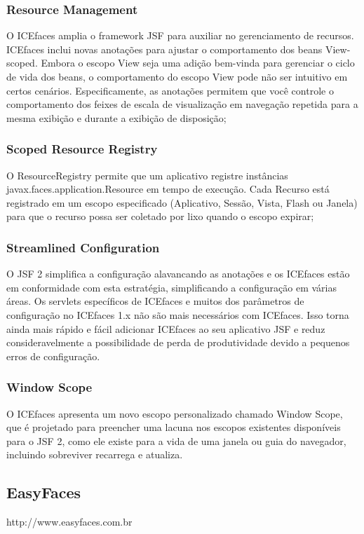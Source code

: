 \documentclass[12pt,a4paper]{article}
\begin{document}
\subsubsection{Resource Management}
O ICEfaces amplia o framework JSF para auxiliar no gerenciamento de recursos. ICEfaces inclui novas anotações para ajustar o comportamento dos beans View-scoped. Embora o escopo View seja uma adição bem-vinda para gerenciar o ciclo de vida dos beans, o comportamento do escopo View pode não ser intuitivo em certos cenários. Especificamente, as anotações permitem que você controle o comportamento dos feixes de escala de visualização em navegação repetida para a mesma exibição e durante a exibição de disposição;

\subsubsection{Scoped Resource Registry}
O ResourceRegistry permite que um aplicativo registre instâncias javax.faces.application.Resource em tempo de execução. Cada Recurso está registrado em um escopo especificado (Aplicativo, Sessão, Vista, Flash ou Janela) para que o recurso possa ser coletado por lixo quando o escopo expirar;

\subsubsection{Streamlined Configuration}
O JSF 2 simplifica a configuração alavancando as anotações e os ICEfaces estão em conformidade com esta estratégia, simplificando a configuração em várias áreas. Os servlets específicos de ICEfaces e muitos dos parâmetros de configuração no ICEfaces 1.x não são mais necessários com ICEfaces. Isso torna ainda mais rápido e fácil adicionar ICEfaces ao seu aplicativo JSF e reduz consideravelmente a possibilidade de perda de produtividade devido a pequenos erros de configuração.

\subsubsection{Window Scope}
O ICEfaces apresenta um novo escopo personalizado chamado Window Scope, que é projetado para preencher uma lacuna nos escopos existentes disponíveis para o JSF 2, como ele existe para a vida de uma janela ou guia do navegador, incluindo sobreviver recarrega e atualiza.

\subsection{EasyFaces}
http://www.easyfaces.com.br 
\end{document}

